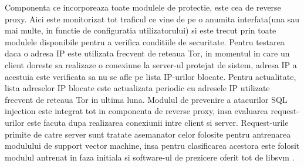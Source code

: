 Componenta ce incorporeaza toate modulele de protectie, este cea de reverse proxy. Aici este monitorizat tot traficul ce vine de pe o anumita interfata(una sau mai multe, in functie de configuratia utilizatorului) si este trecut prin toate modulele disponibile pentru a verifica conditiile de securitate. Pentru testarea daca o adresa IP este utilizata frecvent de reteaua Tor, in momentul in care un client doreste sa realizaze o conexiune la server-ul protejat de sistem, adresa IP a acestuia este verificata sa nu se afle pe lista IP-urilor blocate. Pentru actualitate, lista adreselor IP blocate este actualizata periodic cu adresele IP utilizate frecvent de reteaua Tor in ultima luna. Modulul de prevenire a atacurilor SQL injection este integrat tot in componenta de reverse proxy, insa evaluarea request-urilor este facuta dupa realizarea conexiunii intre client si server. Request-urile primite de catre server sunt tratate asemanator celor folosite pentru antrenarea modulului de support vector machine, insa pentru clasificarea acestora este folosit modulul antrenat in faza initiala si software-ul de prezicere oferit tot de libsvm \cite{libsvm}.
	
	

	





